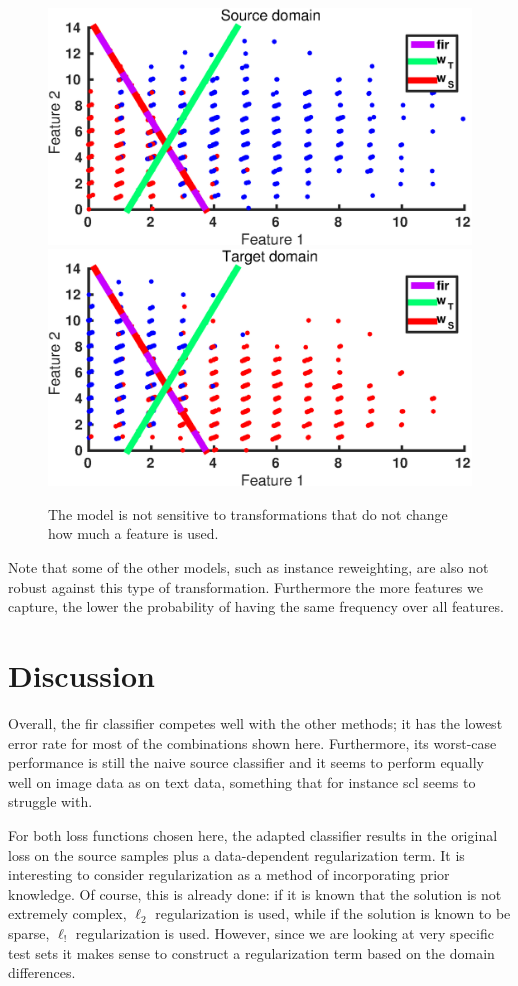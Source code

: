 \documentclass[twoside,11pt]{article}
\begin{document}
\begin{figure}[ht]
	\centering
	\includegraphics[width=.45\textwidth]{images/da_artexp_sens_model_2.eps}
	\includegraphics[width=.45\textwidth]{images/da_artexp_sens_model_3.eps}
	\caption{The model is not sensitive to transformations that do not change how much a feature is used.}
	\label{sens_model}
\end{figure}

Note that some of the other models, such as instance reweighting, are also not robust against this type of transformation. Furthermore the more features we capture, the lower the probability of having the same frequency over all features.

\section{Discussion}
Overall, the {\sc fir} classifier competes well with the other methods; it has the lowest error rate for most of the combinations shown here. Furthermore, its worst-case performance is still the naive source classifier and it seems to perform equally well on image data as on text data, something that for instance {\sc scl} seems to struggle with.

For both loss functions chosen here, the adapted classifier results in the original loss on the source samples plus a data-dependent regularization term. It is interesting to consider regularization as a method of incorporating prior knowledge. Of course, this is already done: if it is known that the solution is not extremely complex, $\ell_{2}$ regularization is used, while if the solution is known to be sparse, $\ell_{!}$ regularization is used. However, since we are looking at very specific test sets it makes sense to construct a regularization term based on the domain differences.
\end{document}

